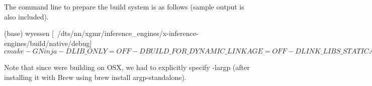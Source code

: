 The command line to prepare the build system is as follows (sample output is also included). 
\begin{DoxyCode}
(base) wyessen [~/dts/nn/xgmr/inference\_engines/x-inference-engines/build/native/debug] $ cmake -G Ninja
       -DLIB\_ONLY=OFF -DBUILD\_FOR\_DYNAMIC\_LINKAGE=OFF -DLINK\_LIBS\_STATICALLY=OFF -DENABLE\_PERF\_MONITORING=OFF
       -DLINKED\_BUNDLE=../../../../../build/debug/output/ffnn\_static.o -DLINKED\_MODEL\_NAME=ffnn ../../../
       -DTARGET\_OPTIONS=-largp

-- The C compiler identification is AppleClang 10.0.1.10010046
-- The CXX compiler identification is AppleClang 10.0.1.10010046
-- Check for working C compiler:
       /Applications/Xcode.app/Contents/Developer/Toolchains/XcodeDefault.xctoolchain/usr/bin/cc
-- Check for working C compiler:
       /Applications/Xcode.app/Contents/Developer/Toolchains/XcodeDefault.xctoolchain/usr/bin/cc -- works
-- Detecting C compiler ABI info
-- Detecting C compiler ABI info - done
-- Detecting C compile features
-- Detecting C compile features - done
-- Check for working CXX compiler:
       /Applications/Xcode.app/Contents/Developer/Toolchains/XcodeDefault.xctoolchain/usr/bin/c++
-- Check for working CXX compiler:
       /Applications/Xcode.app/Contents/Developer/Toolchains/XcodeDefault.xctoolchain/usr/bin/c++ -- works
-- Detecting CXX compiler ABI info
-- Detecting CXX compiler ABI info - done
-- Detecting CXX compile features
-- Detecting CXX compile features - done
Will build the library and the executable
-- Configuring done
-- Generating done
-- Build files have been written to:
       /Users/wyessen/dts/nn/xgmr/inference\_engines/x-inference-engines/build/native/debug

(base) wyessen [~/dts/nn/xgmr/inference\_engines/x-inference-engines/build/native/debug] $ 
\end{DoxyCode}


Note that since we\textquotesingle{}re building on O\+SX, we had to explicitly specify {\ttfamily -\/largp} (after installing it with Brew using {\ttfamily brew install argp-\/standalone}).

